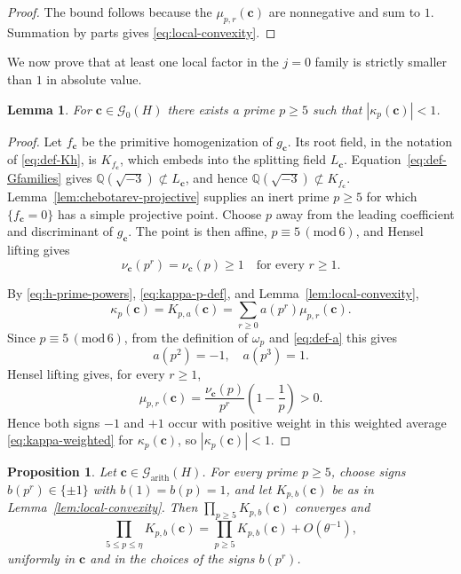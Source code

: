 \documentclass[12pt,reqno]{amsart}
\numberwithin{equation}{section}
\newtheorem{lemma}[theorem]{Lemma}
\newtheorem{proposition}[theorem]{Proposition}
\theoremstyle{definition}
\renewcommand{\le}{\leqslant}
\renewcommand{\ge}{\geqslant}
\newcommand{\QQ}{\mathbb{Q}}
\newcommand{\cc}{\mathbf{c}}
\renewcommand{\pmod}[1]{\,(\mathrm{mod}\,#1)}
\begin{document}
\begin{proof}
The bound follows because the $\mu_{p,r}(\cc)$ are nonnegative and sum to $1$.
Summation by parts gives \eqref{eq:local-convexity}.
\end{proof}

We now prove that at least one local factor in the $j=0$ family is strictly smaller than $1$ in absolute value.

\begin{lemma}\label{lem:kappa-strict}
For $\cc\in \mathcal G_0(H)$ there exists a prime $p\ge 5$ such that $|\kappa_p(\cc)|<1$.
\end{lemma}

\begin{proof}
Let $f_\cc$ be the primitive homogenization of $g_\cc$.
Its root field, in the notation of \eqref{eq:def-Kh}, is $K_{f_\cc}$, which embeds into the splitting field $L_\cc$.
Equation~\eqref{eq:def-Gfamilies} gives $\QQ(\sqrt{-3})\not\subset L_\cc$, and hence $\QQ(\sqrt{-3})\not\subset K_{f_\cc}$.
Lemma~\ref{lem:chebotarev-projective} supplies an inert prime $p\ge5$ for which $\{f_\cc=0\}$ has a simple projective point.
Choose $p$ away from the leading coefficient and discriminant of $g_\cc$.
The point is then affine, $p\equiv5\pmod6$, and Hensel lifting gives
\[
\nu_\cc(p^r)=\nu_\cc(p)\ge1\quad\text{for every }r\ge1.
\]

By \eqref{eq:h-prime-powers}, \eqref{eq:kappa-p-def}, and Lemma~\ref{lem:local-convexity},
\begin{equation}\label{eq:kappa-weighted}
\kappa_p(\cc)
=K_{p,a}(\cc)
=\sum_{r\ge 0}a(p^r)\mu_{p,r}(\cc).
\end{equation}
Since $p\equiv 5\pmod 6$, from the definition of $\omega_p$ and \eqref{eq:def-a} this gives
\[
a(p^2)=-1,\quad a(p^3)=1.
\]
Hensel lifting gives, for every $r\ge1$,
\[
\mu_{p,r}(\cc)
=\frac{\nu_\cc(p)}{p^r}\left(1-\frac1p\right)>0.
\]
Hence both signs $-1$ and $+1$ occur with positive weight in this weighted average \eqref{eq:kappa-weighted} for $\kappa_p(\cc)$, so $|\kappa_p(\cc)|<1$.
\end{proof}

\begin{proposition}\label{prop:local-product-tail}
Let $\cc\in\mathcal G_{\mathrm{arith}}(H)$.
For every prime $p\ge5$, choose signs $b(p^r)\in\{\pm1\}$ with $b(1)=b(p)=1$, and let $K_{p,b}(\cc)$ be as in Lemma~\ref{lem:local-convexity}.
Then $\prod_{p\ge5}K_{p,b}(\cc)$ converges and
\begin{equation}\label{eq:local-product-trunc}
\prod_{5\le p\le\eta}K_{p,b}(\cc)
=\prod_{p\ge5}K_{p,b}(\cc)+O(\theta^{-1}),
\end{equation}
uniformly in $\cc$ and in the choices of the signs $b(p^r)$.
\end{proposition}
\end{document}
